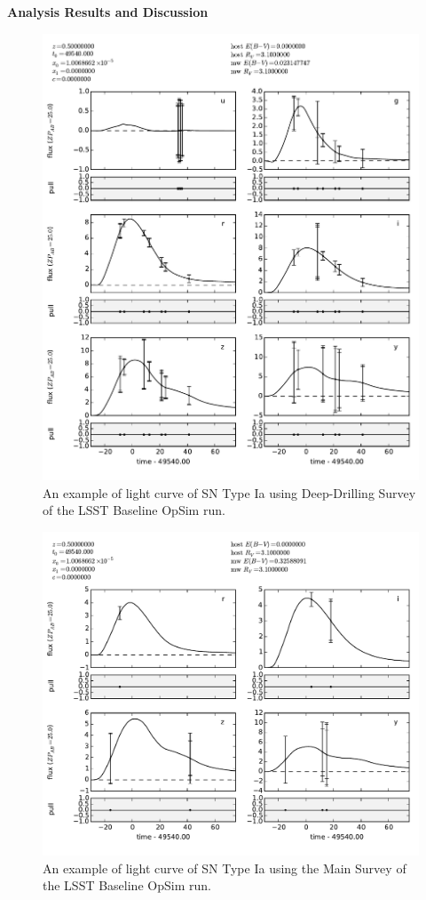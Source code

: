 {\bf Analysis Results and Discussion}


\begin{figure}[tbh!]
\includegraphics[angle=0,width=0.99\hsize:,clip]{figs/SN_290_lc.pdf}
\caption{An example of light curve of SN Type Ia using Deep-Drilling Survey of the LSST Baseline OpSim run.
}
\label{fig:SNIaLCopsimdeep}
\end{figure}



\begin{figure}[tbh!]
\includegraphics[angle=0,width=0.99\hsize:,clip]{figs/SN_309_lc.pdf}
\caption{An example of light curve of SN Type Ia using the Main Survey of the LSST Baseline OpSim
run.
}
\label{fig:SNIaLCopsimmain}
\end{figure}

